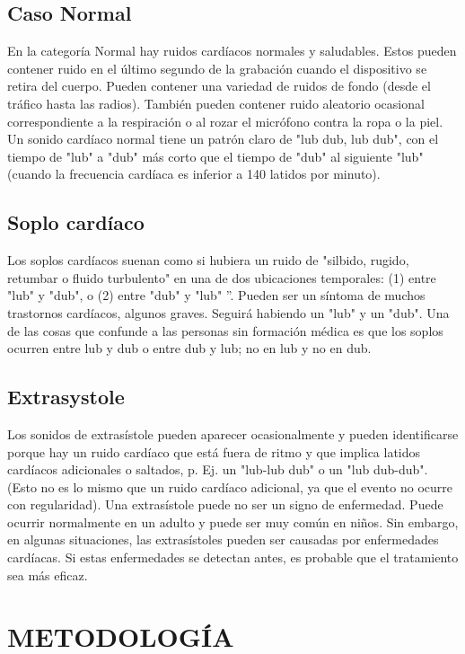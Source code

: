 \documentclass[conference]{IEEEtran}
\begin{document}
\subsection{Caso Normal}
En la categoría Normal hay ruidos cardíacos normales y saludables. Estos pueden contener ruido en el último segundo de la grabación cuando el dispositivo se retira del cuerpo. Pueden contener una variedad de ruidos de fondo (desde el tráfico hasta las radios). También pueden contener ruido aleatorio ocasional correspondiente a la respiración o al rozar el micrófono contra la ropa o la piel. Un sonido cardíaco normal tiene un patrón claro de "lub dub, lub dub", con el tiempo de "lub" a "dub" más corto que el tiempo de "dub" al siguiente "lub" (cuando la frecuencia cardíaca es inferior a 140 latidos por minuto).


\subsection{Soplo cardíaco}

Los soplos cardíacos suenan como si hubiera un ruido de "silbido, rugido, retumbar o fluido turbulento" en una de dos ubicaciones temporales: (1) entre "lub" y "dub", o (2) entre "dub" y "lub" ”. Pueden ser un síntoma de muchos trastornos cardíacos, algunos graves. Seguirá habiendo un "lub" y un "dub". Una de las cosas que confunde a las personas sin formación médica es que los soplos ocurren entre lub y dub o entre dub y lub; no en lub y no en dub.

\subsection{Extrasystole}
Los sonidos de extrasístole pueden aparecer ocasionalmente y pueden identificarse porque hay un ruido cardíaco que está fuera de ritmo y que implica latidos cardíacos adicionales o saltados, p. Ej. un "lub-lub dub" o un "lub dub-dub". (Esto no es lo mismo que un ruido cardíaco adicional, ya que el evento no ocurre con regularidad). Una extrasístole puede no ser un signo de enfermedad. Puede ocurrir normalmente en un adulto y puede ser muy común en niños. Sin embargo, en algunas situaciones, las extrasístoles pueden ser causadas por enfermedades cardíacas. Si estas enfermedades se detectan antes, es probable que el tratamiento sea más eficaz.

\section{METODOLOGÍA}
\end{document}
